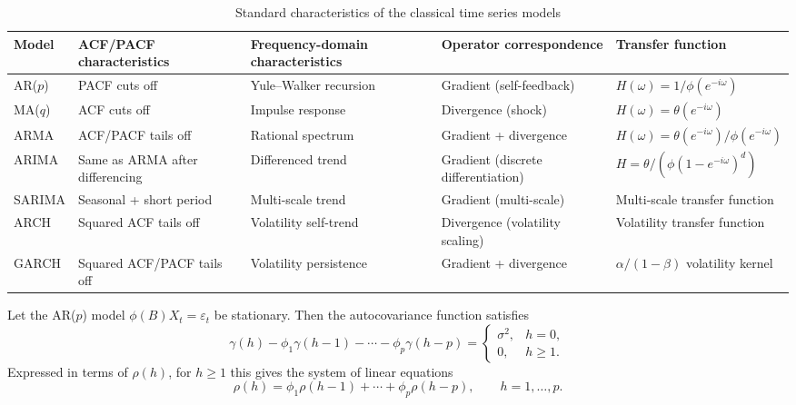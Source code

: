 \begin{table}[htbp]
    \centering
    \caption{Standard characteristics of the classical time series models}
    \label{tab:ts_classical_correspondence}
    \begin{tabular}{>{\centering\arraybackslash}p{2.2cm}>{\centering\arraybackslash}p{2.5cm}>{\centering\arraybackslash}p{2.5cm}>{\centering\arraybackslash}p{2.5cm}>{\centering\arraybackslash}p{3cm}}
        \toprule
        Model & ACF/PACF characteristics & Frequency-domain characteristics & Operator correspondence & Transfer function \\
        \midrule
        AR($p$) & PACF cuts off & Yule--Walker recursion & Gradient (self-feedback) & $H(\omega) = 1/\phi(e^{-i\omega})$ \\
        MA($q$) & ACF cuts off & Impulse response & Divergence (shock) & $H(\omega) = \theta(e^{-i\omega})$ \\
        ARMA & ACF/PACF tails off & Rational spectrum & Gradient + divergence & $H(\omega) = \theta(e^{-i\omega})/\phi(e^{-i\omega})$ \\
        ARIMA & Same as ARMA after differencing & Differenced trend & Gradient (discrete differentiation) & $H = \theta/(\phi(1-e^{-i\omega})^d)$ \\
        SARIMA & Seasonal + short period & Multi-scale trend & Gradient (multi-scale) & Multi-scale transfer function \\
        ARCH & Squared ACF tails off & Volatility self-trend & Divergence (volatility scaling) & Volatility transfer function \\
        GARCH & Squared ACF/PACF tails off & Volatility persistence & Gradient + divergence & $\alpha/(1-\beta)$ volatility kernel \\
        \bottomrule
    \end{tabular}
\end{table}

\begin{theorem}\label{thm:ts_yule_walker}
Let the AR($p$) model $\phi(B)X_t=\varepsilon_t$ be stationary. Then the autocovariance function satisfies
\[
\gamma(h)-\phi_1\gamma(h-1)-\cdots-\phi_p\gamma(h-p)=\begin{cases}\sigma^2,&h=0,\\0,&h\ge1.\end{cases}
\]
Expressed in terms of $\rho(h)$, for $h\ge1$ this gives the system of linear equations
\[
\rho(h)=\phi_1\rho(h-1)+\cdots+\phi_p\rho(h-p),\qquad h=1,\dots,p.
\]
\end{theorem}

